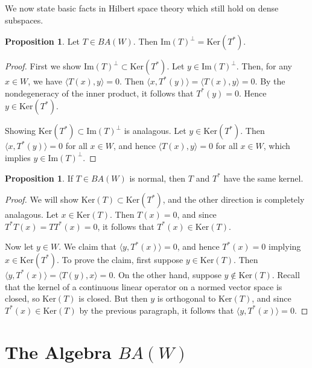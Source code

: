 \documentclass{dcthesis}
\numberwithin{equation}{section}
\numberwithin{equation}{section}
\theoremstyle{definition}
\newtheorem{proposition}[equation]{Proposition}
\begin{document}
We now state basic facts in Hilbert space theory which still hold on dense subspaces.

\begin{proposition}
\label{prop_im_perp_ker_ast}
	Let $T\in BA(W)$. Then $\text{Im}(T)^\perp = \text{Ker}(T^\ast)$.	
\end{proposition}
\begin{proof}
	First we show $\text{Im}(T)^\perp \subset \text{Ker}(T^\ast)$. Let $y\in\text{Im}(T)^\perp$. Then, for any $x\in W$, we have $\langle T(x), y \rangle = 0$. Then $\langle x, T^\ast (y)\rangle = \langle T(x), y \rangle = 0$. By the nondegeneracy of the inner product, it follows that $T^\ast(y)=0$. Hence $y\in\text{Ker}(T^\ast)$.

	Showing $\text{Ker}(T^\ast)\subset\text{Im}(T)^\perp$ is analagous. Let $y\in\text{Ker}(T^\ast)$. Then $\langle x, T^\ast(y) \rangle = 0$ for all $x\in W$, and hence $\langle T(x), y \rangle = 0$ for all $x\in W$, which implies $y\in\text{Im}(T)^\perp$.
\end{proof}

\begin{proposition}
\label{prop_normal_same_kernel}
	If $T\in BA(W)$ is normal, then $T$ and $T^\ast$ have the same kernel.
\end{proposition}
\begin{proof}
	We will show $\text{Ker}(T)\subset\text{Ker}(T^\ast)$, and the other direction is completely analagous. Let $x\in\text{Ker}(T)$. Then $T(x) = 0$, and since $T^\ast T(x)= TT^\ast(x)=0$, it follows that $T^\ast(x)\in\text{Ker}(T)$.

	Now let $y\in W$. We claim that $\langle y, T^\ast(x) \rangle=0$, and hence $T^\ast(x)=0$ implying $x\in \text{Ker}(T^\ast)$. To prove the claim, first suppose $y\in\text{Ker}(T)$. Then $\langle y, T^\ast(x) \rangle = \langle T(y), x \rangle = 0$. On the other hand, suppose $y\not\in\text{Ker}(T)$. Recall that the kernel of a continuous linear operator on a normed vector space is closed, so $\text{Ker}(T)$ is closed. But then $y$ is orthogonal to $\text{Ker}(T)$, and since $T^\ast(x)\in\text{Ker}(T)$ by the previous paragraph, it follows that $\langle y, T^\ast(x) \rangle = 0$. 
\end{proof}


\section{The Algebra \texorpdfstring{$BA(W)$}{BA(W)}} %
\end{document}
